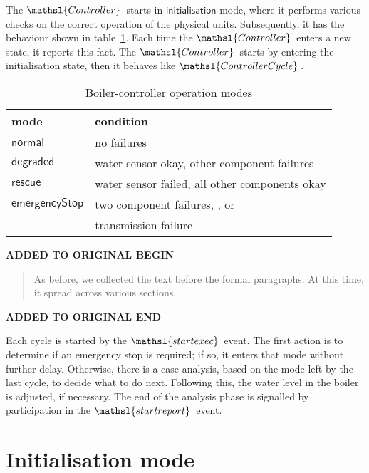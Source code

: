 \documentclass{report}
\newcommand{\event}[1]{\mathsl{#1}}
\renewcommand{\freetype}[1]{\mathsf{#1}}
\newcommand{\freetypedegraded}{\freetype{degraded}}
\newcommand{\freetypeemergencyStop }{\freetype{emergencyStop}}
\newcommand{\freetypeinitialisation}{\freetype{initialisation}}
\newcommand{\freetypenormal}{\freetype{normal}}
\newcommand{\freetyperescue}{\freetype{rescue}}
\newenvironment{addedstuff}{\begin{flushleft}\textbf{ADDED TO ORIGINAL BEGIN}\begin{quote}\begin{minipage}{.8\textwidth}}{\end{minipage}\end{quote}\textbf{ADDED TO ORIGINAL END}\end{flushleft}}
\begin{document}
The \( \mathsl{Controller} \, \)\/ starts in \(
\freetypeinitialisation \)\/ mode, where it performs various checks on
the correct operation of the physical units.  Subsequently, it has the
behaviour shown in table~\ref{tab:controller-modes}.
Each time the \( \mathsl{Controller} \, \)\/ enters a new state, it
reports this fact. The \( \mathsl{Controller} \, \)\/ starts by entering the
initialisation state, then it behaves like \( \mathsl{ControllerCycle}
\, \).

\begin{table}[htbp]
  \begin{center}
    \bigskip %
    \begin{tabular}{l|l}
      \bfseries{mode} & \bfseries{condition}
      \\ %
      \hline %
      \( \freetypenormal \) & no failures
      \\ %
      \( \freetypedegraded \) & water sensor okay, other component failures
      \\ %
      \( \freetyperescue \) & water sensor failed, all other components okay
      \\ %
      \( \freetypeemergencyStop \) & two component failures,
      \event{emergencystop.\true}, or
      \\ %
      & transmission failure
    \end{tabular}
    \caption{Boiler-controller operation modes}
    \label{tab:controller-modes}
  \end{center}
\end{table}

\begin{addedstuff}
   As before, we collected the text before the formal paragraphs.
   At this time, it spread across various sections.
\end{addedstuff}

Each cycle is started by the \( \event{startexec} \, \)\/ event.  The
first action is to determine if an emergency stop is required; if so,
it enters that mode without further delay.  Otherwise, there is a case
analysis, based on the mode left by the last cycle, to decide what to
do next.  Following this, the water level in the boiler is adjusted,
if necessary.  The end of the analysis phase is signalled by
participation in the \( \event{startreport} \, \)\/ event.

\section{Initialisation mode}
\end{document}
